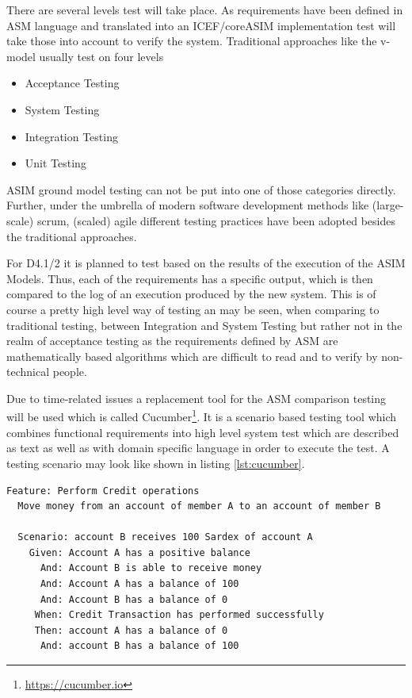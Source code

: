 There are several levels test will take place. As requirements have been defined in ASM language and translated into an ICEF/coreASIM implementation test will take those into account to verify the system. Traditional approaches like the v-model \cite{forsberg1991relationship} usually test on four levels

\begin{itemize}
	\item Acceptance Testing
	\item System Testing
	\item Integration Testing
	\item Unit Testing
\end{itemize}

ASIM ground model testing can not be put into one of those categories directly. Further, under the umbrella of modern software development methods like (large-scale) scrum, (scaled) agile different testing practices have been adopted besides the traditional approaches.

For D4.1/2 it is planned to test based on the results of the execution of the ASIM Models. Thus, each of the requirements has a specific output, which is then compared to the log of an execution produced by the new system. This is of course a pretty high level way of testing an may be seen, when comparing to traditional testing, between Integration and System Testing but rather not in the realm of acceptance testing as the requirements defined by ASM are mathematically based algorithms which are difficult to read and to verify by non-technical people.

Due to time-related issues a replacement tool for the ASM comparison testing will be used which is called Cucumber\footnote{\url{https://cucumber.io}}. It is a scenario based testing tool which combines functional requirements into high level system test which are described as text as well as with domain specific language in order to execute the test. A testing scenario may look like shown in listing \ref{lst:cucumber}.

\begin{center}
\begin{minipage}{0.8\textwidth}
\small
\begin{lstlisting}[language=cucumber,firstnumber=1,caption={\bf\small Cucumber test example},captionpos=b,label=lst:cucumber]
Feature: Perform Credit operations
  Move money from an account of member A to an account of member B
  
  Scenario: account B receives 100 Sardex of account A
    Given: Account A has a positive balance
      And: Account B is able to receive money
      And: Account A has a balance of 100
      And: Account B has a balance of 0
     When: Credit Transaction has performed successfully
     Then: account A has a balance of 0
      And: account B has a balance of 100
\end{lstlisting}
\end{minipage}
\end{center}

